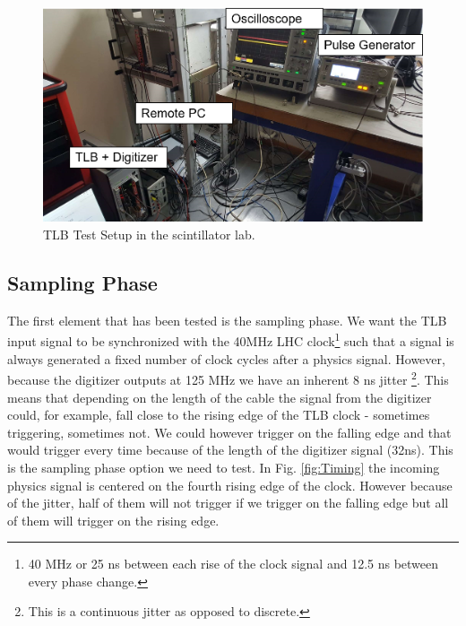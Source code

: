 \begin{figure}
  \centering
    \includegraphics[width=1.0\textwidth]{TLBSetup.png}
    \caption[TLB Test Setup]{TLB Test Setup in the scintillator lab.}
    \label{fig:TLBtestSetup}   
\end{figure}

\subsection{Sampling Phase}

The first element that has been tested is the sampling phase. We want the TLB input signal to be synchronized with the 40MHz LHC clock\footnote{40 MHz or 25 ns between each rise of the clock signal and 12.5 ns between every phase change.} such that a signal is always generated a fixed number of clock cycles after a physics signal. However, because the digitizer outputs at 125 MHz we have an inherent 8 ns jitter \footnote{This is a continuous jitter as opposed to discrete.}. This means that depending on the length of the cable the signal from the digitizer could, for example, fall close to the rising edge of the TLB clock - sometimes triggering, sometimes not. We could however trigger on the falling edge and that would trigger every time because of the length of the digitizer signal (32ns). This is the sampling phase option we need to test. In Fig. \ref{fig:Timing} the incoming physics signal is centered on the fourth rising edge of the clock. However because of the jitter, half of them will not trigger if we trigger on the falling edge but all of them will trigger on the rising edge. 

